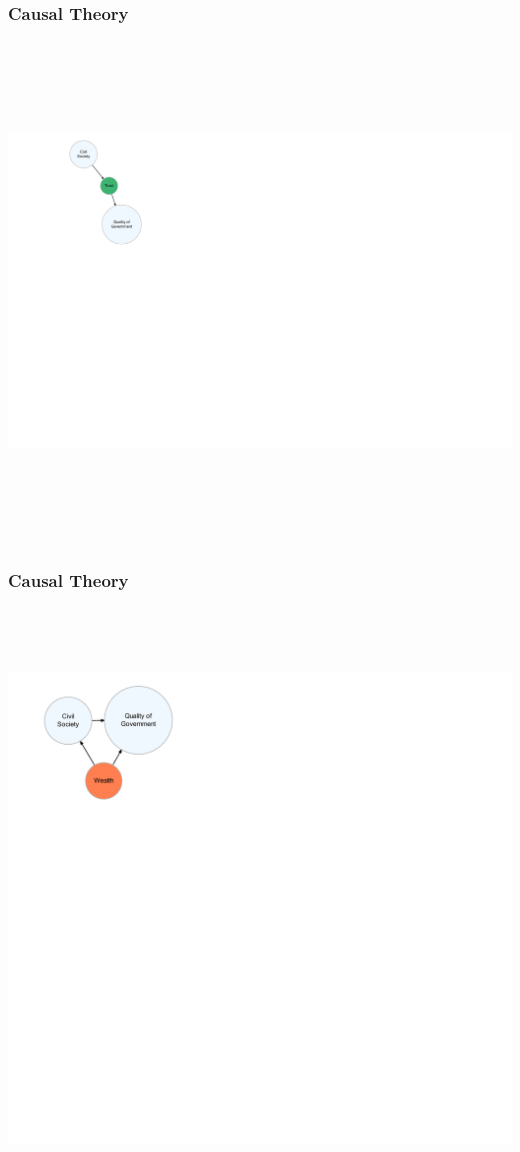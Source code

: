 \documentclass[xcolor=x11names,compress]{beamer}\usepackage[]{graphicx}\usepackage[]{color}
\newenvironment{knitrout}{}{} %
\renewcommand{\(}{\begin{columns}}
\renewcommand{\)}{\end{columns}}
\newcommand{\<}[1]{\begin{column}{#1}}
\renewcommand{\>}{\end{column}}
\begin{document}
\begin{frame}
\frametitle{Causal Theory}
\begin{knitrout}
\color{fgcolor}

{\centering \includegraphics[width=800px,height=500]{figure/unnamed-chunk-3-1} 

}



\end{knitrout}
\end{frame}


\begin{frame}
\frametitle{Causal Theory}
\begin{knitrout}
\color{fgcolor}

{\centering \includegraphics[width=600px,height=600]{figure/unnamed-chunk-4-1} 

}



\end{knitrout}
\end{frame}
\end{document}
